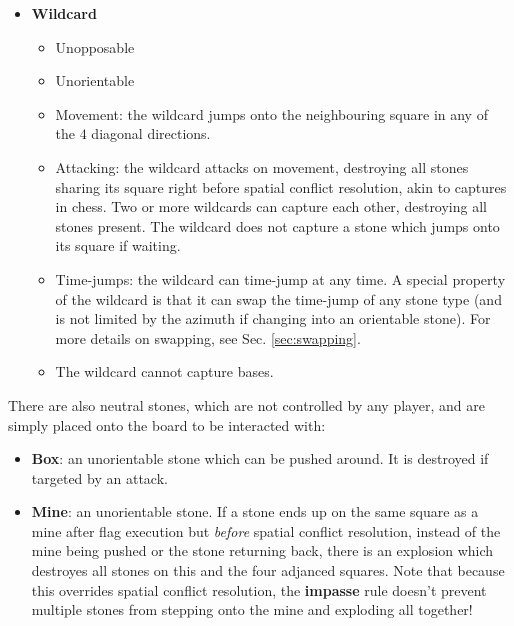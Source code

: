 \documentclass[12pt]{article}
\begin{document}
\begin{itemize}
\begin{itemize}
		\end{itemize}
	\item \textbf{Wildcard}
		\begin{itemize}
		\item Unopposable
		\item Unorientable
		\item Movement: the wildcard jumps onto the neighbouring square in any of the $4$ diagonal directions.
		\item Attacking: the wildcard attacks on movement, destroying all stones sharing its square right before spatial conflict resolution, akin to captures in chess. Two or more wildcards can capture each other, destroying all stones present. The wildcard does not capture a stone which jumps onto its square if waiting.
		\item Time-jumps: the wildcard can time-jump at any time. A special property of the wildcard is that it can swap the time-jump of any stone type (and is not limited by the azimuth if changing into an orientable stone). For more details on swapping, see Sec. \ref{sec:swapping}.
		\item The wildcard cannot capture bases.
		\end{itemize}
	\end{itemize}
	There are also neutral stones, which are not controlled by any player, and are simply placed onto the board to be interacted with:
	\begin{itemize}
		\item \textbf{Box}: an unorientable stone which can be pushed around. It is destroyed if targeted by an attack.
		\item \textbf{Mine}: an unorientable stone. If a stone ends up on the same square as a mine after flag execution but \textit{before} spatial conflict resolution, instead of the mine being pushed or the stone returning back, there is an explosion which destroyes all stones on this and the four adjanced squares. Note that because this overrides spatial conflict resolution, the \textbf{impasse} rule doesn't prevent multiple stones from stepping onto the mine and exploding all together!
	\end{itemize}
	
\end{document}
